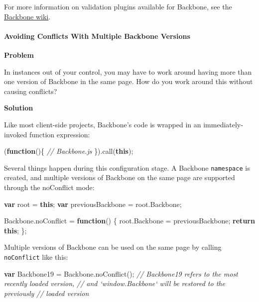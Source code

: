 \documentclass[9pt]{book}
\newenvironment{Shaded}{}{}
\newcommand{\KeywordTok}[1]{\textcolor[rgb]{0.00,0.44,0.13}{\textbf{{#1}}}}
\newcommand{\CommentTok}[1]{\textcolor[rgb]{0.38,0.63,0.69}{\textit{{#1}}}}
\newcommand{\OtherTok}[1]{\textcolor[rgb]{0.00,0.44,0.13}{{#1}}}
\newcommand{\FunctionTok}[1]{\textcolor[rgb]{0.02,0.16,0.49}{{#1}}}
\newcommand{\NormalTok}[1]{{#1}}
\begin{document}
For more information on validation plugins available for Backbone, see
the
\href{https://github.com/documentcloud/backbone/wiki/Extensions\%2C-Plugins\%2C-Resources\#model}{Backbone
wiki}.

\paragraph{Avoiding Conflicts With Multiple Backbone
Versions}\label{avoiding-conflicts-with-multiple-backbone-versions}

\textbf{Problem}

In instances out of your control, you may have to work around having
more than one version of Backbone in the same page. How do you work
around this without causing conflicts?

\textbf{Solution}

Like most client-side projects, Backbone's code is wrapped in an
immediately-invoked function expression:

\begin{Shaded}
\begin{Highlighting}[]
\NormalTok{(}\KeywordTok{function}\NormalTok{()\{}
  \CommentTok{// Backbone.js}
\NormalTok{\}).}\FunctionTok{call}\NormalTok{(}\KeywordTok{this}\NormalTok{);}
\end{Highlighting}
\end{Shaded}

Several things happen during this configuration stage. A Backbone
\texttt{namespace} is created, and multiple versions of Backbone on the
same page are supported through the noConflict mode:

\begin{Shaded}
\begin{Highlighting}[]
\KeywordTok{var} \NormalTok{root = }\KeywordTok{this}\NormalTok{;}
\KeywordTok{var} \NormalTok{previousBackbone = }\OtherTok{root}\NormalTok{.}\FunctionTok{Backbone}\NormalTok{;}

\OtherTok{Backbone}\NormalTok{.}\FunctionTok{noConflict} \NormalTok{= }\KeywordTok{function}\NormalTok{() \{}
  \OtherTok{root}\NormalTok{.}\FunctionTok{Backbone} \NormalTok{= previousBackbone;}
  \KeywordTok{return} \KeywordTok{this}\NormalTok{;}
\NormalTok{\};}
\end{Highlighting}
\end{Shaded}

Multiple versions of Backbone can be used on the same page by calling
\texttt{noConflict} like this:

\begin{Shaded}
\begin{Highlighting}[]
\KeywordTok{var} \NormalTok{Backbone19 = }\OtherTok{Backbone}\NormalTok{.}\FunctionTok{noConflict}\NormalTok{();}
\CommentTok{// Backbone19 refers to the most recently loaded version,}
\CommentTok{// and `window.Backbone` will be restored to the previously}
\CommentTok{// loaded version}
\end{Highlighting}
\end{Shaded}
\end{document}
